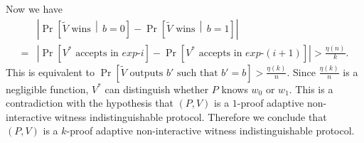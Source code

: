 \documentclass[draft]{article}
\begin{document}
\begin{enumerate}
  Now we have
  \begin{align*}
    & \left|\Pr\left[\tilde{V} \text{ wins} \,\middle|\, b=0\right] - \Pr\left[\tilde{V} \text{ wins} \,\middle|\, b=1\right]\right| \\
    = & \left|\Pr\left[V^*\text{ accepts in } exp\mbox{-}i\right] - \Pr\left[V^*\text{ accepts in } exp\mbox{-}(i+1)\right]\right| > \frac{\eta(n)}{k}.
  \end{align*}
  This is equivalent to $\Pr[\tilde{V}\text{ outputs } b' \text{ such that } b'=b] > \frac{\eta(k)}{n}$.
  Since $\frac{\eta(k)}{n}$ is a negligible function, $V^*$ can distinguish whether $P$ knows $w_0$ or $w_1$.
  This is a contradiction with the hypothesis that $(P, V)$ is a $1$-proof adaptive non-interactive witness indistinguishable protocol.
  Therefore we conclude that $(P, V)$ is a $k$-proof adaptive non-interactive witness indistinguishable protocol.
\end{enumerate}
\end{document}
